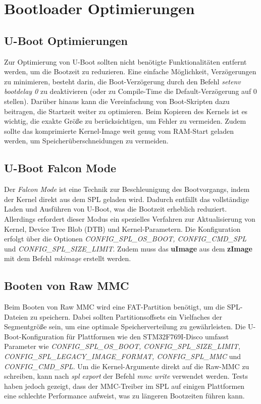 
\section{Bootloader Optimierungen}

\subsection{U-Boot Optimierungen}
Zur Optimierung von U-Boot sollten nicht benötigte Funktionalitäten entfernt werden, um die Bootzeit zu reduzieren. Eine einfache Möglichkeit, Verzögerungen zu minimieren, besteht darin, die Boot-Verzögerung durch den Befehl \textit{setenv bootdelay 0} zu deaktivieren (oder zu Compile-Time die Default-Verzögerung auf 0 stellen). Darüber hinaus kann die Vereinfachung von Boot-Skripten dazu beitragen, die Startzeit weiter zu optimieren. Beim Kopieren des Kernels ist es wichtig, die exakte Größe zu berücksichtigen, um Fehler zu vermeiden. Zudem sollte das komprimierte Kernel-Image weit genug vom RAM-Start geladen werden, um Speicherüberschneidungen zu vermeiden.

\subsection{U-Boot Falcon Mode}
Der \textit{Falcon Mode} ist eine Technik zur Beschleunigung des Bootvorgangs, indem der Kernel direkt aus dem SPL geladen wird. Dadurch entfällt das vollständige Laden und Ausführen von U-Boot, was die Bootzeit erheblich reduziert. Allerdings erfordert dieser Modus ein spezielles Verfahren zur Aktualisierung von Kernel, Device Tree Blob (DTB) und Kernel-Parametern. Die Konfiguration erfolgt über die Optionen \textit{CONFIG\_SPL\_OS\_BOOT, CONFIG\_CMD\_SPL} und \textit{CONFIG\_SPL\_SIZE\_LIMIT}. Zudem muss das \textbf{uImage} aus dem \textbf{zImage} mit dem Befehl \textit{mkimage} erstellt werden.

\subsection{Booten von Raw MMC}
Beim Booten von Raw MMC wird eine FAT-Partition benötigt, um die SPL-Dateien zu speichern. Dabei sollten Partitionsoffsets ein Vielfaches der Segmentgröße sein, um eine optimale Speicherverteilung zu gewährleisten. Die U-Boot-Konfiguration für Plattformen wie den STM32F769I-Disco umfasst Parameter wie \textit{CONFIG\_SPL\_OS\_BOOT, CONFIG\_SPL\_SIZE\_LIMIT, CONFIG\_SPL\_LEGACY\_IMAGE\_FORMAT, CONFIG\_SPL\_MMC} und \textit{CONFIG\_CMD\_SPL}. Um die Kernel-Argumente direkt auf die Raw-MMC zu schreiben, kann nach \textit{spl export} der Befehl \textit{mmc write} verwendet werden. Tests haben jedoch gezeigt, dass der MMC-Treiber im SPL auf einigen Plattformen eine schlechte Performance aufweist, was zu längeren Bootzeiten führen kann.

